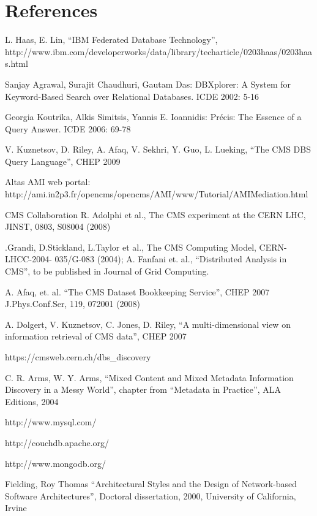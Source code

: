 \documentclass[a4paper]{jpconf}
\begin{document}
\section*{References}
\begin{thebibliography}{9}
L. Haas, E. Lin,
``IBM Federated Database Technology'', \\
http://www.ibm.com/developerworks/data/library/techarticle/0203haas/0203haas.html

Sanjay Agrawal, Surajit Chaudhuri, Gautam Das: DBXplorer: A System for
Keyword-Based Search over Relational Databases. ICDE 2002: 5-16

Georgia Koutrika, Alkis Simitsis, Yannis E. Ioannidis: Pr\'{e}cis: The Essence of
a Query Answer. ICDE 2006: 69-78

 V. Kuznetsov, D. Riley, A. Afaq, V. Sekhri, Y. Guo, L. Lueking,
``The CMS DBS Query Language'', CHEP 2009

Altas AMI web portal:
http://ami.in2p3.fr/opencms/opencms/AMI/www/Tutorial/AMIMediation.html

 CMS Collaboration R. Adolphi et al., The CMS experiment at the CERN LHC, JINST, 0803, S08004 (2008)

.Grandi, D.Stickland, L.Taylor et al., The CMS Computing Model, CERN-LHCC-2004- 035/G-083 (2004);
A. Fanfani et. al.,
``Distributed Analysis in CMS'', to be published in Journal of Grid Computing.

 A. Afaq, et. al. ``The CMS Dataset Bookkeeping Service'', CHEP 2007 
J.Phys.Conf.Ser, 119, 072001 (2008)

 A. Dolgert, V. Kuznetsov, C. Jones, D. Riley, 
``A multi-dimensional view on information retrieval of CMS data'', CHEP 2007

 https://cmsweb.cern.ch/dbs\_discovery

C. R. Arms, W. Y. Arms, ``Mixed Content and Mixed Metadata 
Information Discovery in a Messy World'',
chapter from ``Metadata in Practice'', ALA Editions, 2004

http://www.mysql.com/

http://couchdb.apache.org/

http://www.mongodb.org/

Fielding, Roy Thomas ``Architectural Styles and the Design of 
Network-based Software Architectures'', Doctoral dissertation, 2000,
University of California, Irvine


\end{thebibliography}
\end{document}
